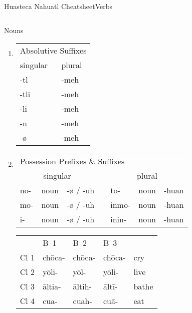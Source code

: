 \documentclass[12pt]{beamer}
\newcommand{\nah}[1]{\textcolor{nahgrn}{#1}}
\newcommand{\trs}[1]{\textcolor{nahblu}{#1}}
\begin{document}
\begin{frame}%
	{Huasteca Nahuatl Cheatsheet}{Verbs}
	\begin{columns}[t]
		\begin{column}{.23\linewidth}
			\begin{block}{Nouns}
				\begin{enumerate}
					\item \begin{tabular}[t]{ll}
						\multicolumn{2}{l}{Absolutive \trs{Suffixes}} \\
						singular    & plural             \\
						\trs{-tl}   & \trs{-meh}         \\
						\trs{-tli}  & \trs{-meh}         \\
						\trs{-li}   & \trs{-meh}         \\
						\trs{-n}    & \trs{-meh}         \\
						\trs{-ø}    & \trs{-meh}         \\
					\end{tabular}%
					\item \begin{tabular}[t]{lllllll}
						\multicolumn{7}{l}{Possession \nah{Prefixes} \& \trs{Suffixes}}    	   		       \\
						\multicolumn{3}{c}{singular} 			& \vline & \multicolumn{3}{c}{plural}	   \\
						\cline{1-7}
						\nah{no-} & noun & \trs{-ø} / \trs{-uh} & \vline & \nah{to-}   & noun & \trs{-huan}\\
						\nah{mo-} & noun & \trs{-ø} / \trs{-uh} & \vline & \nah{inmo-} & noun & \trs{-huan}\\
						\nah{i-}  & noun & \trs{-ø} / \trs{-uh} & \vline & \nah{inin-} & noun & \trs{-huan}\\
					\end{tabular}%
					\begin{example}
						\begin{tabular}{lllll}
							& B~1          & B~2          & B~3          &             \\
							Cl 1 & \nah{chōca-} & \nah{chōca-} & \nah{chōca-} & \trs{cry}   \\
							Cl 2 & \nah{yōli-}  & \nah{yōl-}   & \nah{yōli-}  & \trs{live}  \\
							Cl 3 & \nah{āltia-} & \nah{āltih-} & \nah{āltī-}  & \trs{bathe} \\
							Cl 4 & \nah{cua-}   & \nah{cuah-}  & \nah{cuā-}   & \trs{eat}
						\end{tabular}
					\end{example}
				\end{enumerate}
			\end{block}
		\end{column}
		

\end{columns}
\end{frame}
\end{document}
